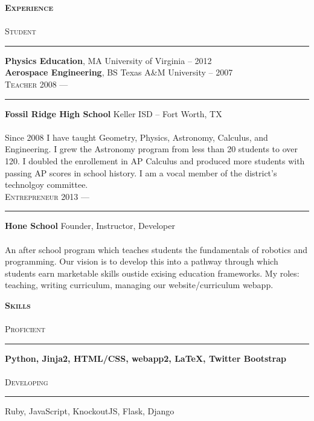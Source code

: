 \documentclass{article}
\begin{document}
\begin{multicols}{2}

\textsc{\bfseries \Large Experience} \\
\\
\textsc{\large Student }
\vspace{4pt} \hrule \vspace{4pt}

{\bfseries Physics Education}, MA \hfill University of Virginia -- 2012 \\
{\bfseries Aerospace Engineering}, BS \hfill Texas A\&M University -- 2007\\

\vspace{8pt}
\textsc{\large Teacher \hfill 2008 --- }
\vspace{4pt} \hrule \vspace{4pt}
{\bfseries Fossil Ridge High School} \hfill Keller ISD -- Fort Worth, TX \\
\\
Since 2008 I have taught Geometry, Physics, Astronomy, Calculus, and Engineering. I grew the Astronomy program from less than 20 students to over 120. I doubled the enrollement in AP Calculus and produced more students with passing AP scores in school history. I am a vocal member of the district's technolgoy committee. \\

\vspace{8pt}
\textsc{\large Entrepreneur \hfill 2013 --- }
\vspace{4pt} \hrule \vspace{4pt}
{\bfseries Hone School} \hfill Founder, Instructor, Developer\\
\\
An after school program which teaches students the fundamentals of robotics and programming. Our vision is to develop this into a pathway through which students earn marketable skills oustide exising education frameworks. My roles: teaching, writing curriculum, managing our website/curriculum webapp. 

\columnbreak


\textsc{\bfseries \Large Skills} \\
\\
\textsc{\large Proficient }
\vspace{4pt} \hrule \vspace{4pt}
{\Large \bfseries Python, Jinja2, HTML/CSS, webapp2, \LaTeX, Twitter Bootstrap} \\
\\
\textsc{\large Developing }
\vspace{4pt} \hrule \vspace{4pt}
{\Large Ruby, JavaScript, KnockoutJS, Flask, Django} \\


\end{multicols}
\end{document}
